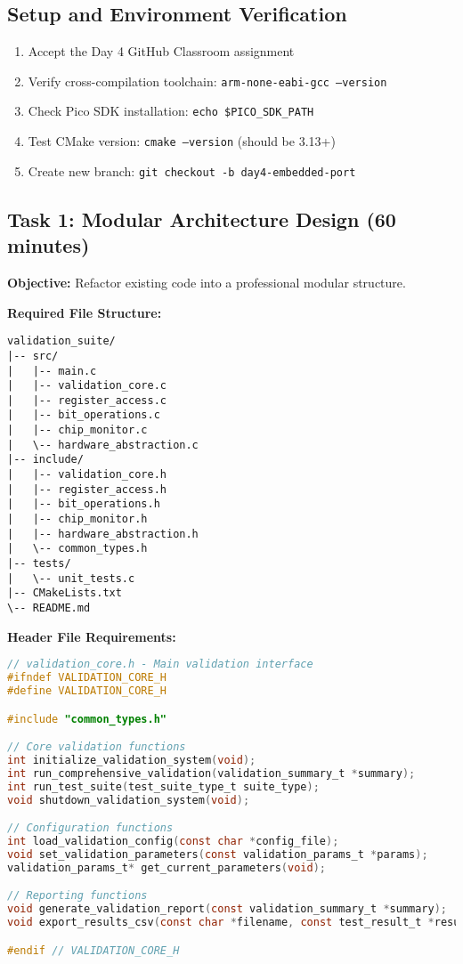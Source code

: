 \documentclass[11pt,a4paper]{article}
\begin{document}
\subsection{Setup and Environment Verification}
\begin{enumerate}
    \item Accept the Day 4 GitHub Classroom assignment
    \item Verify cross-compilation toolchain: \texttt{arm-none-eabi-gcc --version}
    \item Check Pico SDK installation: \texttt{echo \$PICO\_SDK\_PATH}
    \item Test CMake version: \texttt{cmake --version} (should be 3.13+)
    \item Create new branch: \texttt{git checkout -b day4-embedded-port}
\end{enumerate}

\subsection{Task 1: Modular Architecture Design (60 minutes)}

\textbf{Objective:} Refactor existing code into a professional modular structure.

\textbf{Required File Structure:}
\begin{verbatim}
validation_suite/
|-- src/
|   |-- main.c
|   |-- validation_core.c
|   |-- register_access.c
|   |-- bit_operations.c
|   |-- chip_monitor.c
|   \-- hardware_abstraction.c
|-- include/
|   |-- validation_core.h
|   |-- register_access.h
|   |-- bit_operations.h
|   |-- chip_monitor.h
|   |-- hardware_abstraction.h
|   \-- common_types.h
|-- tests/
|   \-- unit_tests.c
|-- CMakeLists.txt
\-- README.md
\end{verbatim}

\textbf{Header File Requirements:}
\begin{lstlisting}[language=C]
// validation_core.h - Main validation interface
#ifndef VALIDATION_CORE_H
#define VALIDATION_CORE_H

#include "common_types.h"

// Core validation functions
int initialize_validation_system(void);
int run_comprehensive_validation(validation_summary_t *summary);
int run_test_suite(test_suite_type_t suite_type);
void shutdown_validation_system(void);

// Configuration functions
int load_validation_config(const char *config_file);
void set_validation_parameters(const validation_params_t *params);
validation_params_t* get_current_parameters(void);

// Reporting functions
void generate_validation_report(const validation_summary_t *summary);
void export_results_csv(const char *filename, const test_result_t *results, int count);

#endif // VALIDATION_CORE_H
\end{lstlisting}
\end{document}
